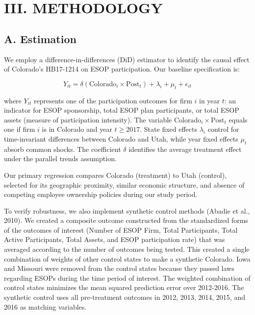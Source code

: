 \documentclass[12pt]{article}
\renewcommand{\normalsize}{\fontsize{12pt}{14pt}\selectfont}
\begin{document}
\section*{\centering \normalsize \textbf{III. METHODOLOGY}}

\subsection*{A. Estimation}

We employ a difference-in-differences (DiD) estimator to identify the causal effect of Colorado's HB17-1214 on ESOP participation. Our baseline specification is:

\begin{equation}
Y_{it} = \delta (\text{Colorado}_i \times \text{Post}_t) + \lambda_i + \mu_t + \epsilon_{it}
\end{equation}

where $Y_{it}$ represents one of the participation outcomes for firm $i$ in year $t$: an indicator for ESOP sponsorship, total ESOP plan participants, or total ESOP assets (measure of participation intensity). The variable $\text{Colorado}_i \times \text{Post}_t$ equals one if firm $i$ is in Colorado and year $t \geq 2017$. State fixed effects $\lambda_i$ control for time-invariant differences between Colorado and Utah, while year fixed effects $\mu_t$ absorb common shocks. The coefficient $\delta$ identifies the average treatment effect under the parallel trends assumption.

Our primary regression compares Colorado (treatment) to Utah (control), selected for its geographic proximity, similar economic structure, and absence of competing employee ownership policies during our study period.

To verify robustness, we also implement synthetic control methods (Abadie et al., 2010). We created a composite outcome constructed from the standardized forms of the outcomes of interest (Number of ESOP Firm, Total Participants, Total Active Participants, Total Assets, and ESOP participation rate)  that was averaged according to the number of outcomes being tested. This created a single combination of weights of other control states to make a synthetic Colorado. Iowa and Missouri were removed from the control states because they passed laws regarding ESOPs during the time period of interest. The weighted combination of control states minimizes the mean squared prediction error over 2012-2016. The synthetic control uses all pre-treatment outcomes in 2012, 2013, 2014, 2015, and 2016 as matching variables. 
\end{document}
